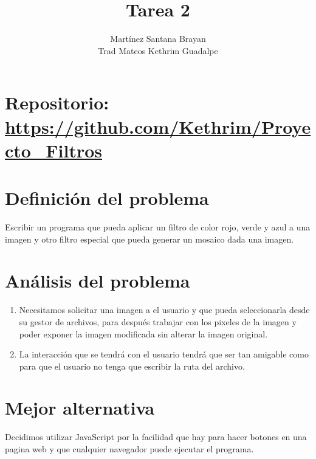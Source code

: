 \documentclass{article}
\title{Tarea 2}
\author{Martínez Santana Brayan\\
Trad Mateos Kethrim Guadalpe
}
\begin{document}
\maketitle
\section*{Repositorio: \url{https://github.com/Kethrim/Proyecto_Filtros}}
\section{Definición del problema}
Escribir un programa que pueda aplicar un filtro de color rojo, verde y azul a una imagen y otro filtro especial que pueda generar un mosaico dada una imagen.

\section{Análisis del problema}
\begin{enumerate}
    \item Necesitamos solicitar una imagen a el usuario y que pueda seleccionarla desde su gestor de archivos, para después trabajar con los pixeles de la imagen y poder exponer la imagen modificada sin alterar la imagen original.
    \item La interacción que se tendrá con el usuario tendrá que ser tan amigable como para que el usuario no tenga que escribir la ruta del archivo.
\end{enumerate}
\section{Mejor alternativa} Decidimos utilizar JavaScript por la facilidad que hay para hacer botones en una pagina web y que cualquier navegador puede ejecutar el programa.
\end{document}
